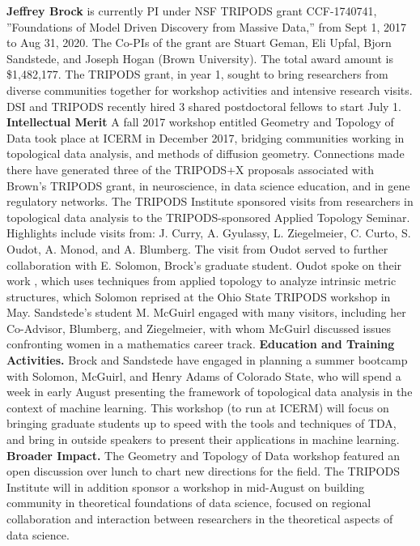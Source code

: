 

\textbf{Jeffrey Brock} is currently PI under NSF TRIPODS grant CCF-1740741, ''Foundations of Model Driven Discovery from Massive Data,'' from Sept 1, 2017 to Aug 31, 2020. The Co-PIs of the grant are Stuart Geman, Eli Upfal, Bjorn Sandstede, and Joseph Hogan (Brown University). The total award amount is \$1,482,177. The TRIPODS grant, in year 1, sought to bring researchers from diverse communities together for workshop activities and intensive research visits. DSI and TRIPODS recently hired 3 shared postdoctoral fellows to start July 1. 
\textbf{Intellectual Merit} A fall 2017 workshop entitled Geometry and Topology of Data took place at ICERM in December 2017, bridging communities working in topological data analysis, and methods of diffusion geometry. Connections made there have generated three of the TRIPODS+X proposals associated with Brown's TRIPODS grant, in neuroscience, in data science education, and in gene regulatory networks.
The TRIPODS Institute sponsored visits from researchers in topological data analysis to the TRIPODS-sponsored Applied Topology Seminar. Highlights include visits from: J. Curry, A. Gyulassy, L. Ziegelmeier, C. Curto, S. Oudot, A. Monod, and A. Blumberg.
The visit from Oudot served to further collaboration with E. Solomon, Brock's graduate student. Oudot spoke on their work \citep{Oudot:Solomon:persistence}, which uses techniques from applied topology to analyze intrinsic metric structures, which Solomon reprised at the Ohio State TRIPODS workshop in May. Sandstede's student M. McGuirl engaged with many visitors, including her Co-Advisor, Blumberg, and Ziegelmeier, with whom McGuirl discussed issues confronting women in a mathematics career track.
{\bf Education and Training Activities.} Brock and Sandstede have engaged in planning a summer bootcamp with Solomon, McGuirl, and Henry Adams of Colorado State, who will spend a week in early August presenting the framework of topological data analysis in the context of machine learning. This workshop (to run at ICERM) will focus on bringing graduate students up to speed with the tools and techniques of TDA, and bring in outside speakers to present their applications in machine learning.
{\bf Broader Impact.} The Geometry and Topology of Data workshop featured an open discussion over lunch to chart new directions for the field. The TRIPODS Institute will in addition sponsor a workshop in mid-August on building community in theoretical foundations of data science, focused on regional collaboration and interaction between researchers in the theoretical aspects of data science.
